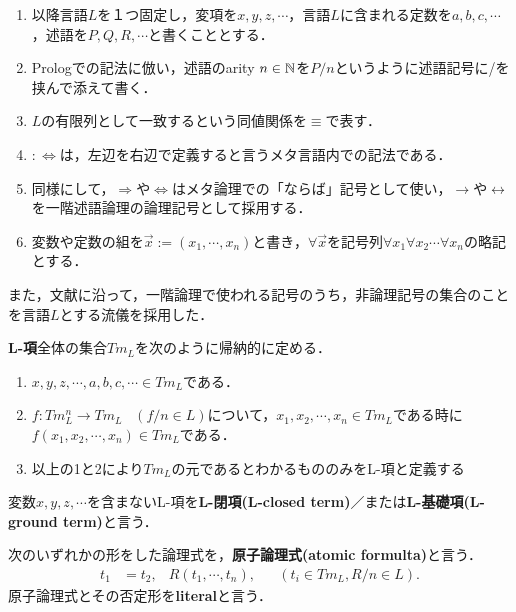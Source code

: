 \documentclass[uplatex,dvipdfmx]{jsarticle}
\begin{document}
\begin{notation}\mbox{}
    \begin{enumerate}
        \item 以降言語$L$を１つ固定し，変項を$x,y,z,\cdots$，言語$L$に含まれる定数を$a,b,c,\cdots$，述語を$P,Q,R,\cdots$と書くこととする．
        \item Prologでの記法に倣い，述語のarity $n\in\mathbb{N}$を$P/n$というように述語記号に/を挟んで添えて書く．
        \item $L$の有限列として一致するという同値関係を$\equiv$で表す．
        \item $:\Leftrightarrow$は，左辺を右辺で定義すると言うメタ言語内での記法である．
        \item 同様にして，$\Rightarrow$や$\Leftrightarrow$はメタ論理での「ならば」記号として使い，$\to$や$\leftrightarrow$を一階述語論理の論理記号として採用する．
        \item 変数や定数の組を$\vec{x}:=(x_1,\cdots,x_n)$と書き，$\forall\vec{x}$を記号列$\forall x_1\forall x_2\cdots\forall x_n$の略記とする．
    \end{enumerate}
\end{notation}
\begin{remark}
    また，文献\cite{新井敏康}に沿って，一階論理で使われる記号のうち，非論理記号の集合のことを言語$L$とする流儀を採用した．
\end{remark}

\begin{definition}[term]
    \textbf{L-項}全体の集合$Tm_L$を次のように帰納的に定める．
    \begin{enumerate}
        \item  $x,y,z,\cdots,a,b,c,\cdots\in Tm_L$である．
        \item  $f:Tm_L^n\to Tm_L\;\;\;(f/n\in L)$について，$x_1,x_2,\cdots,x_n\in Tm_L$である時に$f(x_1,x_2,\cdots,x_n)\in Tm_L$である．
        \item 以上の1と2により$Tm_L$の元であるとわかるもののみをL-項と定義する
    \end{enumerate}
    変数$x,y,z,\cdots$を含まないL-項を\textbf{L-閉項(L-closed term)}／または\textbf{L-基礎項(L-ground term)}と言う．
\end{definition}
\begin{definition}[literal]
    次のいずれかの形をした論理式を，\textbf{原子論理式(atomic formulta)}と言う．
    \begin{align*}
        t_1 &= t_2, & R(t_1,\cdots,t_n), && (t_i\in Tm_L, R/n\in L).
    \end{align*}
    原子論理式とその否定形を\textbf{literal}と言う．
\end{definition}
\end{document}
